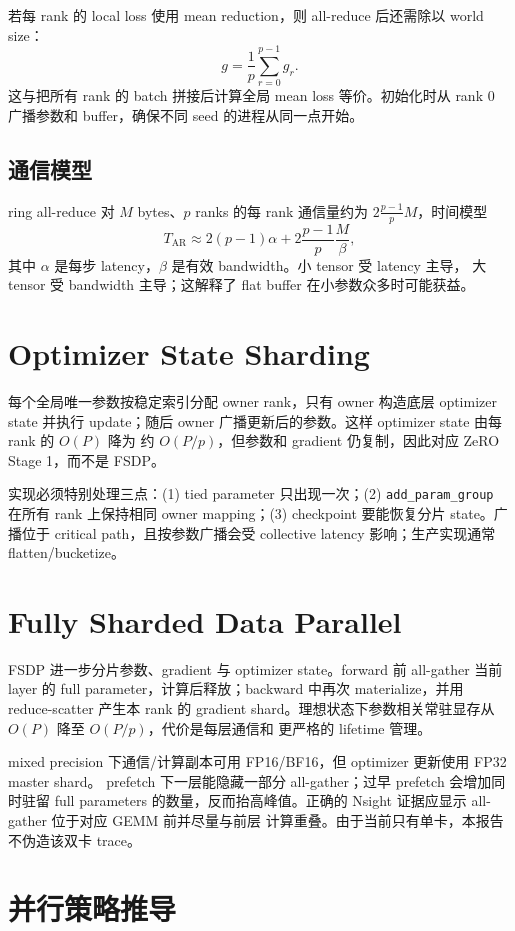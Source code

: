 \documentclass[11pt,a4paper]{ctexart}
\begin{document}
若每 rank 的 local loss 使用 mean reduction，则 all-reduce 后还需除以 world size：
\[
g=\frac1p\sum_{r=0}^{p-1}g_r.
\]
这与把所有 rank 的 batch 拼接后计算全局 mean loss 等价。初始化时从 rank 0 广播参数和
buffer，确保不同 seed 的进程从同一点开始。

\subsection{通信模型}
ring all-reduce 对 $M$ bytes、$p$ ranks 的每 rank 通信量约为
$2\frac{p-1}{p}M$，时间模型
\[
T_{\mathrm{AR}}\approx 2(p-1)\alpha+
2\frac{p-1}{p}\frac{M}{\beta},
\]
其中 $\alpha$ 是每步 latency，$\beta$ 是有效 bandwidth。小 tensor 受 latency 主导，
大 tensor 受 bandwidth 主导；这解释了 flat buffer 在小参数众多时可能获益。

\section{Optimizer State Sharding}
每个全局唯一参数按稳定索引分配 owner rank，只有 owner 构造底层 optimizer state 并执行
update；随后 owner 广播更新后的参数。这样 optimizer state 由每 rank 的 $O(P)$ 降为
约 $O(P/p)$，但参数和 gradient 仍复制，因此对应 ZeRO Stage 1，而不是 FSDP。

实现必须特别处理三点：(1) tied parameter 只出现一次；(2) \texttt{add\_param\_group}
在所有 rank 上保持相同 owner mapping；(3) checkpoint 要能恢复分片 state。广播位于
critical path，且按参数广播会受 collective latency 影响；生产实现通常 flatten/bucketize。

\section{Fully Sharded Data Parallel}
FSDP 进一步分片参数、gradient 与 optimizer state。forward 前 all-gather 当前 layer 的
full parameter，计算后释放；backward 中再次 materialize，并用 reduce-scatter 产生本 rank
的 gradient shard。理想状态下参数相关常驻显存从 $O(P)$ 降至 $O(P/p)$，代价是每层通信和
更严格的 lifetime 管理。

mixed precision 下通信/计算副本可用 FP16/BF16，但 optimizer 更新使用 FP32 master shard。
prefetch 下一层能隐藏一部分 all-gather；过早 prefetch 会增加同时驻留 full parameters
的数量，反而抬高峰值。正确的 Nsight 证据应显示 all-gather 位于对应 GEMM 前并尽量与前层
计算重叠。由于当前只有单卡，本报告不伪造该双卡 trace。

\section{并行策略推导}
\end{document}
